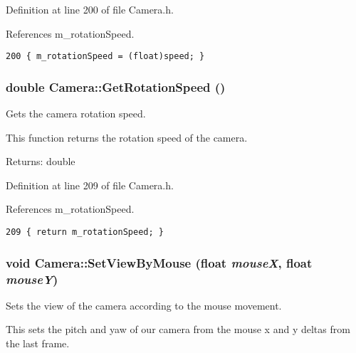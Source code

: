 Definition at line 200 of file Camera.h.

References m\_\-rotationSpeed.

\begin{Code}\begin{verbatim}200 { m_rotationSpeed = (float)speed; }
\end{verbatim}
\end{Code}


\hypertarget{class_camera_eebe84aaf8b615505ef2ad7f7bbffbb9}{
\subsubsection[GetRotationSpeed]{\setlength{\rightskip}{0pt plus 5cm}double Camera::GetRotationSpeed ()}}
\label{class_camera_eebe84aaf8b615505ef2ad7f7bbffbb9}


Gets the camera rotation speed. 

This function returns the rotation speed of the camera.

\begin{Desc}
\item[Returns:]double \end{Desc}


Definition at line 209 of file Camera.h.

References m\_\-rotationSpeed.

\begin{Code}\begin{verbatim}209 { return m_rotationSpeed; }
\end{verbatim}
\end{Code}


\hypertarget{class_camera_05c4a137b939bfdee2b7efea6d67d0e7}{
\subsubsection[SetViewByMouse]{\setlength{\rightskip}{0pt plus 5cm}void Camera::SetViewByMouse (float {\em mouseX}, \/  float {\em mouseY})}}
\label{class_camera_05c4a137b939bfdee2b7efea6d67d0e7}


Sets the view of the camera according to the mouse movement. 

This sets the pitch and yaw of our camera from the mouse x and y deltas from the last frame.

